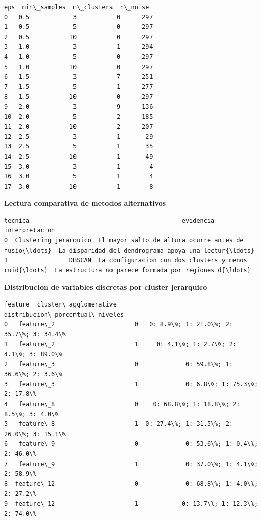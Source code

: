 \documentclass[11pt]{article}
\begin{document}
    
    
    \begin{Verbatim}[commandchars=\\\{\}]
    eps  min\_samples  n\_clusters  n\_noise
0   0.5            3           0      297
1   0.5            5           0      297
2   0.5           10           0      297
3   1.0            3           1      294
4   1.0            5           0      297
5   1.0           10           0      297
6   1.5            3           7      251
7   1.5            5           1      277
8   1.5           10           0      297
9   2.0            3           9      136
10  2.0            5           2      185
11  2.0           10           2      207
12  2.5            3           1       29
13  2.5            5           1       35
14  2.5           10           1       49
15  3.0            3           1        4
16  3.0            5           1        4
17  3.0           10           1        8
    \end{Verbatim}

    
    \textbf{Lectura comparativa de metodos alternativos}

    
    
    \begin{Verbatim}[commandchars=\\\{\}]
                 tecnica                                          evidencia                                     interpretacion
0  Clustering jerarquico  El mayor salto de altura ocurre antes de fusio{\ldots}  La disparidad del dendrograma apoya una lectur{\ldots}
1                 DBSCAN  La configuracion con dos clusters y menos ruid{\ldots}  La estructura no parece formada por regiones d{\ldots}
    \end{Verbatim}

    
    \textbf{Distribucion de variables discretas por cluster jerarquico}

    
    
    \begin{Verbatim}[commandchars=\\\{\}]
      feature  cluster\_agglomerative         distribucion\_porcentual\_niveles
0   feature\_2                      0   0: 8.9\%; 1: 21.0\%; 2: 35.7\%; 3: 34.4\%
1   feature\_2                      1     0: 4.1\%; 1: 2.7\%; 2: 4.1\%; 3: 89.0\%
2   feature\_3                      0             0: 59.8\%; 1: 36.6\%; 2: 3.6\%
3   feature\_3                      1             0: 6.8\%; 1: 75.3\%; 2: 17.8\%
4   feature\_8                      0    0: 68.8\%; 1: 18.8\%; 2: 8.5\%; 3: 4.0\%
5   feature\_8                      1  0: 27.4\%; 1: 31.5\%; 2: 26.0\%; 3: 15.1\%
6   feature\_9                      0             0: 53.6\%; 1: 0.4\%; 2: 46.0\%
7   feature\_9                      1             0: 37.0\%; 1: 4.1\%; 2: 58.9\%
8  feature\_12                      0             0: 68.8\%; 1: 4.0\%; 2: 27.2\%
9  feature\_12                      1            0: 13.7\%; 1: 12.3\%; 2: 74.0\%
    \end{Verbatim}
\end{document}
